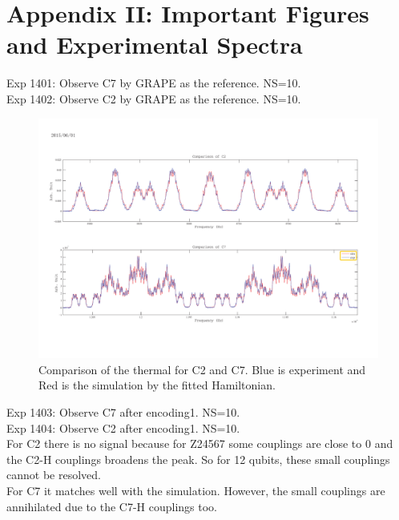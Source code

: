 \clearpage
\section{Appendix II: Important Figures and Experimental Spectra}
Exp 1401: Observe C7 by GRAPE as the reference. NS=10.\\
Exp 1402: Observe C2 by GRAPE as the reference. NS=10. \\

\begin{figure}[htb]
\begin{center}
\includegraphics[width=\columnwidth]{Thermal_C2andC7.pdf}
\end{center}
\setlength{\abovecaptionskip}{-0.35cm}
\caption{\footnotesize{Comparison of the thermal for C2 and C7. Blue is experiment and Red is the simulation by the fitted Hamiltonian.}}\label{1401and1402}
\end{figure}

\clearpage
Exp 1403: Observe C7 after encoding1. NS=10.\\
Exp 1404: Observe C2 after encoding1. NS=10.\\

For C2 there is no signal because for Z24567 some couplings are close to 0 and the C2-H couplings broadens the peak. So for 12 qubits, these small couplings cannot be resolved.\\
For C7 it matches well with the simulation. However, the small couplings are annihilated due to the C7-H couplings too.

